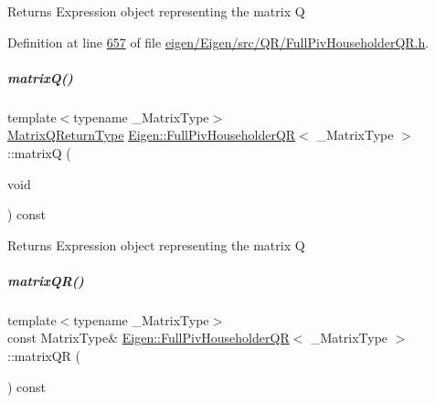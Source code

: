 \begin{DoxyReturn}{Returns}
Expression object representing the matrix Q 
\end{DoxyReturn}


Definition at line \hyperlink{eigen_2_eigen_2src_2_q_r_2_full_piv_householder_q_r_8h_source_l00657}{657} of file \hyperlink{eigen_2_eigen_2src_2_q_r_2_full_piv_householder_q_r_8h_source}{eigen/\+Eigen/src/\+Q\+R/\+Full\+Piv\+Householder\+Q\+R.\+h}.

\mbox{\label{group___q_r___module_aef768081c4fa1ec1902e50585a07490a}} 
\subparagraph{\texorpdfstring{matrix\+Q()}{matrixQ()}\hspace{0.1cm}{\footnotesize\ttfamily [2/2]}}
{\footnotesize\ttfamily template$<$typename \+\_\+\+Matrix\+Type$>$ \\
\hyperlink{group___q_r___module_struct_eigen_1_1internal_1_1_full_piv_householder_q_r_matrix_q_return_type}{Matrix\+Q\+Return\+Type} \hyperlink{group___q_r___module_class_eigen_1_1_full_piv_householder_q_r}{Eigen\+::\+Full\+Piv\+Householder\+QR}$<$ \+\_\+\+Matrix\+Type $>$\+::matrixQ (\begin{DoxyParamCaption}\item[{void}]{ }\end{DoxyParamCaption}) const}

\begin{DoxyReturn}{Returns}
Expression object representing the matrix Q 
\end{DoxyReturn}
\mbox{\label{group___q_r___module_a9c16411e5d8f1fc634a5797018d5aa3e}} 
\subparagraph{\texorpdfstring{matrix\+Q\+R()}{matrixQR()}\hspace{0.1cm}{\footnotesize\ttfamily [1/2]}}
{\footnotesize\ttfamily template$<$typename \+\_\+\+Matrix\+Type$>$ \\
const Matrix\+Type\& \hyperlink{group___q_r___module_class_eigen_1_1_full_piv_householder_q_r}{Eigen\+::\+Full\+Piv\+Householder\+QR}$<$ \+\_\+\+Matrix\+Type $>$\+::matrix\+QR (\begin{DoxyParamCaption}{ }\end{DoxyParamCaption}) const\hspace{0.3cm}{\ttfamily [inline]}}

